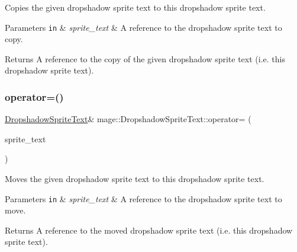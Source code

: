 Copies the given dropshadow sprite text to this dropshadow sprite text.


\begin{DoxyParams}[1]{Parameters}
\mbox{\tt in}  & {\em sprite\+\_\+text} & A reference to the dropshadow sprite text to copy. \\
\hline
\end{DoxyParams}
\begin{DoxyReturn}{Returns}
A reference to the copy of the given dropshadow sprite text (i.\+e. this dropshadow sprite text). 
\end{DoxyReturn}
\hypertarget{classmage_1_1_dropshadow_sprite_text_aea70f005fd9eae94aee9da27aa54534b}{}\label{classmage_1_1_dropshadow_sprite_text_aea70f005fd9eae94aee9da27aa54534b} 
\subsubsection{\texorpdfstring{operator=()}{operator=()}\hspace{0.1cm}{\footnotesize\ttfamily [2/2]}}
{\footnotesize\ttfamily \hyperlink{classmage_1_1_dropshadow_sprite_text}{Dropshadow\+Sprite\+Text}\& mage\+::\+Dropshadow\+Sprite\+Text\+::operator= (\begin{DoxyParamCaption}\item[{\hyperlink{classmage_1_1_dropshadow_sprite_text}{Dropshadow\+Sprite\+Text} \&\&}]{sprite\+\_\+text }\end{DoxyParamCaption})\hspace{0.3cm}{\ttfamily [delete]}}

Moves the given dropshadow sprite text to this dropshadow sprite text.


\begin{DoxyParams}[1]{Parameters}
\mbox{\tt in}  & {\em sprite\+\_\+text} & A reference to the dropshadow sprite text to move. \\
\hline
\end{DoxyParams}
\begin{DoxyReturn}{Returns}
A reference to the moved dropshadow sprite text (i.\+e. this dropshadow sprite text). 
\end{DoxyReturn}
\hypertarget{classmage_1_1_dropshadow_sprite_text_a2aceed81bffc3b6f51cf40bea0eb8405}{}\label{classmage_1_1_dropshadow_sprite_text_a2aceed81bffc3b6f51cf40bea0eb8405} 
